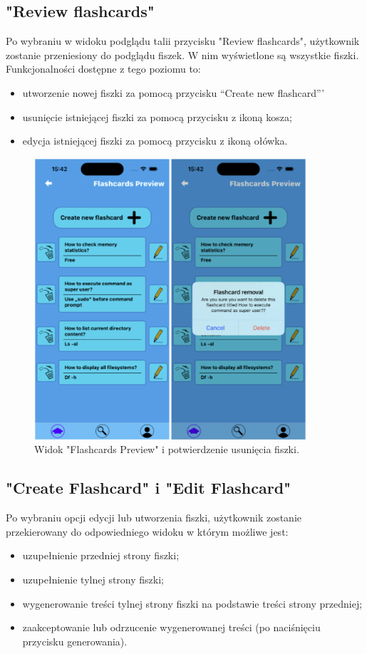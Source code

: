 \subsection{"Review flashcards"}
Po wybraniu w widoku podglądu talii przycisku "Review flashcards", użytkownik zostanie przeniesiony do podglądu fiszek. W nim wyświetlone są wszystkie fiszki. Funkcjonalności dostępne z tego poziomu to:
\begin{itemize}
    \item utworzenie nowej fiszki za pomocą przycisku “Create new flashcard”'
    \item usunięcie istniejącej fiszki za pomocą przycisku z ikoną kosza;
    \item edycja istniejącej fiszki za pomocą przycisku z ikoną ołówka.
\end{itemize}


\begin{figure}[H]
    \centering
    \includegraphics[width=0.9\textwidth]{chapters/chapter_10/images_mobile/mobile_flashcards_preview}
    \caption{Widok "Flashcards Preview" i potwierdzenie usunięcia fiszki.}
    \label{img:mobile_flashcards_preview}
\end{figure}


\subsection{"Create Flashcard" i "Edit Flashcard"}
Po wybraniu opcji edycji lub utworzenia fiszki, użytkownik zostanie przekierowany do odpowiedniego widoku w którym możliwe jest:
\begin{itemize}
    \item uzupełnienie przedniej strony fiszki;
    \item uzupełnienie tylnej strony fiszki;
    \item wygenerowanie treści tylnej strony fiszki na podstawie treści strony przedniej;
    \item zaakceptowanie lub odrzucenie wygenerowanej treści (po naciśnięciu przycisku generowania).
\end{itemize}


